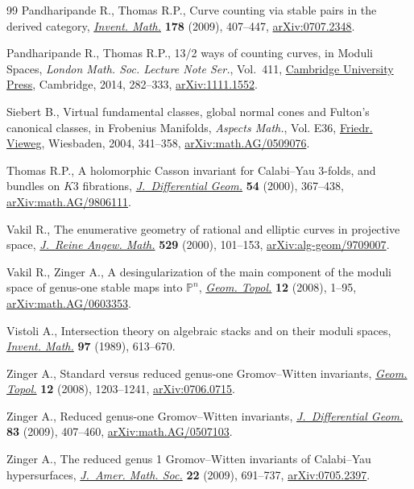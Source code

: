 \documentclass[pdftex]{sigma}
\numberwithin{equation}{section}
\theoremstyle{plain}
\theoremstyle{definition}
\theoremstyle{remark}
\begin{document}
\begin{thebibliography}{99}
Pandharipande R., Thomas R.P., Curve counting via stable pairs in the derived
 category, \href{https://doi.org/10.1007/s00222-009-0203-9}{\textit{Invent. Math.}} \textbf{178} (2009), 407--447,
 \href{https://arxiv.org/abs/0707.2348}{arXiv:0707.2348}.

Pandharipande R., Thomas R.P., 13/2 ways of counting curves, in Moduli Spaces,
 \textit{London Math. Soc. Lecture Note Ser.}, Vol.~411, \href{https://doi.org/10.1017/CBO9781107279544.007}{Cambridge University
 Press}, Cambridge, 2014, 282--333, \href{https://arxiv.org/abs/1111.1552}{arXiv:1111.1552}.

Siebert B., Virtual fundamental classes, global normal cones and {F}ulton's
 canonical classes, in Frobenius Manifolds, \textit{Aspects Math.}, Vol. E36,
 \href{https://doi.org/10.1007/978-3-322-80236-1_13}{Friedr. Vieweg}, Wiesbaden, 2004, 341--358, \href{https://arxiv.org/abs/math.AG/0509076}{arXiv:math.AG/0509076}.

Thomas R.P., A holomorphic {C}asson invariant for {C}alabi--{Y}au 3-folds, and
 bundles on {$K3$} fibrations, \href{https://doi.org/10.4310/jdg/1214341649}{\textit{J.~Differential Geom.}} \textbf{54}
 (2000), 367--438, \href{https://arxiv.org/abs/math.AG/9806111}{arXiv:math.AG/9806111}.

Vakil R., The enumerative geometry of rational and elliptic curves in
 projective space, \href{https://doi.org/10.1515/crll.2000.094}{\textit{J.~Reine Angew. Math.}} \textbf{529} (2000),
 101--153, \href{https://arxiv.org/abs/alg-geom/9709007}{arXiv:alg-geom/9709007}.

Vakil R., Zinger A., A desingularization of the main component of the moduli
 space of genus-one stable maps into {${\mathbb P}^n$}, \href{https://doi.org/10.2140/gt.2008.12.1}{\textit{Geom. Topol.}}
 \textbf{12} (2008), 1--95, \href{https://arxiv.org/abs/math.AG/0603353}{arXiv:math.AG/0603353}.

Vistoli A., Intersection theory on algebraic stacks and on their moduli spaces,
 \href{https://doi.org/10.1007/BF01388892}{\textit{Invent. Math.}} \textbf{97} (1989), 613--670.

Zinger A., Standard versus reduced genus-one {G}romov--{W}itten invariants,
 \href{https://doi.org/10.2140/gt.2008.12.1203}{\textit{Geom. Topol.}} \textbf{12} (2008), 1203--1241, \href{https://arxiv.org/abs/0706.0715}{arXiv:0706.0715}.

Zinger A., Reduced genus-one {G}romov--{W}itten invariants,
 \href{https://doi.org/10.4310/jdg/1261495337}{\textit{J.~Differential Geom.}} \textbf{83} (2009), 407--460, \href{https://arxiv.org/abs/math.AG/0507103}{arXiv:math.AG/0507103}.

Zinger A., The reduced genus 1 {G}romov--{W}itten invariants of {C}alabi--{Y}au
 hypersurfaces, \href{https://doi.org/10.1090/S0894-0347-08-00625-5}{\textit{J.~Amer. Math. Soc.}} \textbf{22} (2009), 691--737,
 \href{https://arxiv.org/abs/0705.2397}{arXiv:0705.2397}.


\end{thebibliography}
\end{document}
